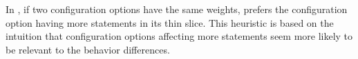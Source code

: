 In \ourtool, if two configuration options have the
same weights, \ourtool prefers the configuration option
having more statements in its thin slice. This heuristic
is based on the intuition that configuration options affecting
more statements seem more likely to be relevant to the behavior
differences.












%



